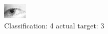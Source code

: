 \begin{figure}[h!]
\begin{center}
\includegraphics[width=0.60\columnwidth]{figures/ID1347_class_4_target_3.png}
\end{center}
\caption{ Classification: 4 actual target: 3}
\label{fig:ID1347_class_4_target_3}
\end{figure}
